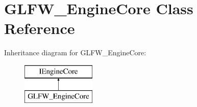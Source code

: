 \hypertarget{class_g_l_f_w___engine_core}{\section{G\+L\+F\+W\+\_\+\+Engine\+Core Class Reference}
\label{class_g_l_f_w___engine_core}
}
Inheritance diagram for G\+L\+F\+W\+\_\+\+Engine\+Core\+:\begin{figure}[H]
\begin{center}
\leavevmode
\includegraphics[height=2.000000cm]{class_g_l_f_w___engine_core}
\end{center}
\end{figure}
